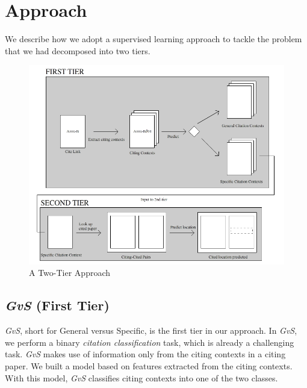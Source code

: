\chapter{Approach}
\label{approach}
We describe how we adopt a supervised learning approach to tackle the problem that we had decomposed into two tiers.

\begin{figure}[h]
  \centering
  \includegraphics[scale=0.60]{./twotier}
  \caption{A Two-Tier Approach}
  \label{fig:twotier}
\end{figure}

\section{{\it GvS} (First Tier)}
\label{firsttier}
{\it GvS}, short for General versus Specific, is the first tier in our approach. In {\it GvS}, we perform a binary \textit{citation classification} task, which is already a challenging task. 
{\it GvS} makes use of information only from the citing contexts in a citing paper. We built a model based on features extracted from the citing contexts. With this model, {\it GvS} classifies citing contexts into one of the two classes. 

